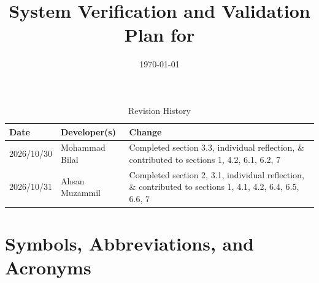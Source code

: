 \documentclass[10pt,titlepage]{article}
\begin{document}
\title{System Verification and Validation Plan for \progname{}} 
\author{\authname}
\date{\today}
	
\maketitle


\begin{table}[!htbp]
\caption{Revision History} \label{TblRevisionHistory}
\begin{tabularx}{\textwidth}{llX}
\toprule
\textbf{Date} & \textbf{Developer(s)} & \textbf{Change}\\
\midrule
2026/10/30 & Mohammad Bilal & Completed section 3.3, individual reflection, \& contributed to sections 1, 4.2, 6.1, 6.2, 7 \\
2026/10/31 & Ahsan Muzammil & Completed section 2, 3.1, individual reflection, \& contributed to sections 1, 4.1, 4.2, 6.4, 6.5, 6.6, 7 \\
\bottomrule
\end{tabularx}
\end{table}

\newpage

\tableofcontents

\newpage

\listoftables

\listoffigures
{}

\newpage

\section{Symbols, Abbreviations, and Acronyms}
\end{document}
